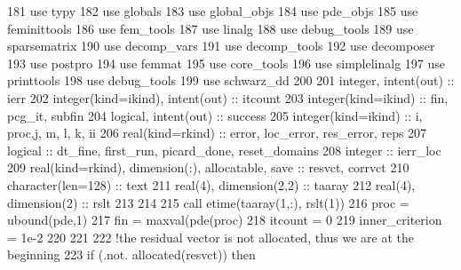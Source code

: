 \begin{DoxyCode}
181         \textcolor{keywordtype}{use }typy
182         \textcolor{keywordtype}{use }globals
183         \textcolor{keywordtype}{use }global_objs
184         \textcolor{keywordtype}{use }pde_objs
185         \textcolor{keywordtype}{use }feminittools
186         \textcolor{keywordtype}{use }fem_tools
187         \textcolor{keywordtype}{use }linalg
188         \textcolor{keywordtype}{use }debug_tools
189         \textcolor{keywordtype}{use }sparsematrix
190         \textcolor{keywordtype}{use }decomp_vars
191         \textcolor{keywordtype}{use }decomp_tools
192         \textcolor{keywordtype}{use }decomposer
193         \textcolor{keywordtype}{use }postpro
194         \textcolor{keywordtype}{use }femmat
195         \textcolor{keywordtype}{use }core_tools
196         \textcolor{keywordtype}{use }simplelinalg
197         \textcolor{keywordtype}{use }printtools
198         \textcolor{keywordtype}{use }debug_tools
199         \textcolor{keywordtype}{use }schwarz_dd
200 
201         \textcolor{keywordtype}{integer}, \textcolor{keywordtype}{intent(out)} :: ierr
202         \textcolor{keywordtype}{integer(kind=ikind)}, \textcolor{keywordtype}{intent(out)} :: itcount
203         \textcolor{keywordtype}{integer(kind=ikind)} ::  fin, pcg\_it, subfin
204         \textcolor{keywordtype}{logical}, \textcolor{keywordtype}{intent(out)} :: success
205         \textcolor{keywordtype}{integer(kind=ikind)} :: i, proc,j, m, l, k, ii
206         \textcolor{keywordtype}{real(kind=rkind)} :: error, loc\_error, res\_error, reps
207         \textcolor{keywordtype}{logical} :: dt\_fine, first\_run, picard\_done, reset\_domains
208         \textcolor{keywordtype}{integer} :: ierr\_loc
209         \textcolor{keywordtype}{real(kind=rkind)}, \textcolor{keywordtype}{dimension(:)}, \textcolor{keywordtype}{allocatable}, \textcolor{keywordtype}{save} :: resvct, corrvct
210         \textcolor{keywordtype}{character(len=128)} :: text
211         \textcolor{keywordtype}{real(4)}, \textcolor{keywordtype}{dimension(2,2)} :: taaray
212         \textcolor{keywordtype}{real(4)}, \textcolor{keywordtype}{dimension(2)} :: rslt
213 
214         
215         \textcolor{keyword}{call }etime(taaray(1,:), rslt(1))
216         proc = ubound(pde,1)
217         fin = maxval(pde(proc)%
218         itcount = 0
219         inner_criterion = 1e-2
220 
221         
222         \textcolor{comment}{!the residual vector is not allocated, thus we are at the beginning}
223         \textcolor{keywordflow}{if} (.not. \textcolor{keyword}{allocated}(resvct)) \textcolor{keywordflow}{then}

\end{DoxyCode}
